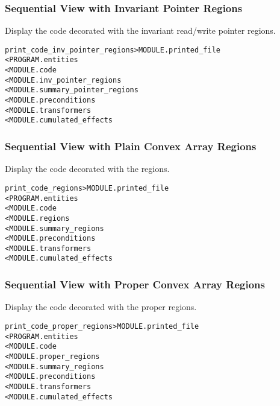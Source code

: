 \documentclass[a4paper]{report}
\newenvironment{PipsMake}{\begin{alltt}}{\end{alltt}}
\newenvironment{PipsPass}[1]{\label{pass:#1}}{}
\begin{document}
\subsubsection{Sequential View with Invariant Pointer Regions}

\begin{PipsPass}{print_code_inv_regions}
Display the code decorated with the invariant read/write pointer regions.
\end{PipsPass}

\begin{PipsMake}
print_code_inv_pointer_regions              > MODULE.printed_file
        < PROGRAM.entities
        < MODULE.code
        < MODULE.inv_pointer_regions
        < MODULE.summary_pointer_regions
        < MODULE.preconditions
        < MODULE.transformers
        < MODULE.cumulated_effects
\end{PipsMake}


\subsubsection{Sequential View with Plain Convex Array Regions}
\label{sec:plain-regions}

\begin{PipsPass}{print_code_regions}
Display the code decorated with the regions.
\end{PipsPass}

\begin{PipsMake}
print_code_regions              > MODULE.printed_file
        < PROGRAM.entities
        < MODULE.code
        < MODULE.regions
        < MODULE.summary_regions
        < MODULE.preconditions
        < MODULE.transformers
        < MODULE.cumulated_effects
\end{PipsMake}

\subsubsection{Sequential View with Proper Convex Array Regions}

\begin{PipsPass}{print_code_proper_regions}
Display the code decorated with the proper regions.
\end{PipsPass}

\begin{PipsMake}
print_code_proper_regions              > MODULE.printed_file
        < PROGRAM.entities
        < MODULE.code
        < MODULE.proper_regions
        < MODULE.summary_regions
        < MODULE.preconditions
        < MODULE.transformers
        < MODULE.cumulated_effects
\end{PipsMake}
\end{document}
